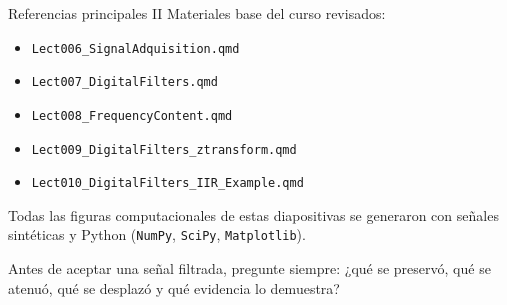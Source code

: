 \documentclass[
  ignorenonframetext,
  aspectratio=169,
  spanish,
  professionalfonts]{beamer}
\providecommand{\tightlist}{%
  \setlength{\itemsep}{0pt}\setlength{\parskip}{0pt}}
\begin{document}
\begin{frame}[fragile]{Referencias principales II}
\protect{}\label{referencias-principales-ii}
Materiales base del curso revisados:

\begin{itemize}
\tightlist
\item
  \texttt{Lect006\_SignalAdquisition.qmd}
\item
  \texttt{Lect007\_DigitalFilters.qmd}
\item
  \texttt{Lect008\_FrequencyContent.qmd}
\item
  \texttt{Lect009\_DigitalFilters\_ztransform.qmd}
\item
  \texttt{Lect010\_DigitalFilters\_IIR\_Example.qmd}
\end{itemize}

Todas las figuras computacionales de estas diapositivas se generaron con
señales sintéticas y Python (\texttt{NumPy}, \texttt{SciPy},
\texttt{Matplotlib}).

\begin{tcolorbox}[enhanced jigsaw, arc=.35mm, bottomrule=.15mm, bottomtitle=1mm, breakable, colback=white, colbacktitle=quarto-callout-important-color!10!white, colframe=quarto-callout-important-color-frame, coltitle=black, left=2mm, leftrule=.75mm, opacityback=0, opacitybacktitle=0.6, rightrule=.15mm, title={Cierre}, titlerule=0mm, toprule=.15mm, toptitle=1mm]

Antes de aceptar una señal filtrada, pregunte siempre: ¿qué se preservó,
qué se atenuó, qué se desplazó y qué evidencia lo demuestra?

\end{tcolorbox}
\end{frame}
\end{document}
